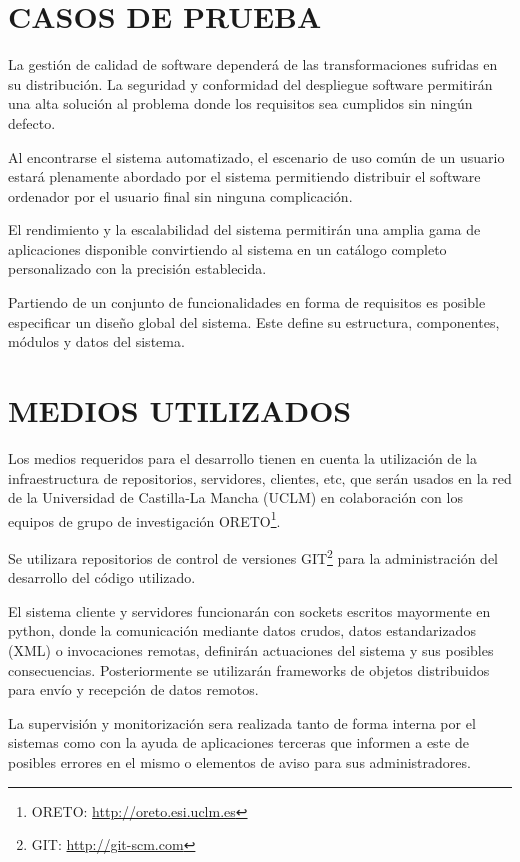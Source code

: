 \section{\uppercase{Casos de prueba}}

La gestión de calidad de software dependerá de las transformaciones sufridas
en su distribución.
La seguridad y conformidad del despliegue software permitirán una alta
solución al problema donde los requisitos sea cumplidos sin ningún defecto.

Al encontrarse el sistema automatizado, el escenario de uso común de un
usuario estará plenamente abordado por el sistema permitiendo distribuir el
software ordenador por el usuario final sin ninguna complicación.

El rendimiento y la escalabilidad del sistema permitirán una amplia gama de
aplicaciones disponible convirtiendo al sistema en un catálogo completo
personalizado con la precisión establecida.

Partiendo de un conjunto de funcionalidades en forma de requisitos es posible
especificar un diseño global del sistema. Este define su estructura,
componentes, módulos y datos del sistema.

\section{\uppercase{Medios utilizados}}

Los medios requeridos para el desarrollo tienen en cuenta la utilización de la
infraestructura de repositorios, servidores, clientes, etc, que serán usados
en la red de la Universidad de Castilla-La Mancha (UCLM) en colaboración
con los equipos de grupo de
investigación ORETO\footnote{ORETO:
\url{http://oreto.esi.uclm.es}\label{ftn:Oreto}}.

Se utilizara repositorios de control de versiones GIT\footnote{GIT:
\url{http://git-scm.com}\label{ftn:GIT}} para la administración del desarrollo
del código utilizado.

El sistema cliente y servidores funcionarán con sockets escritos mayormente en
python, donde la comunicación mediante datos crudos, datos estandarizados
(\acs{XML}\label{acro:XML}) o invocaciones remotas, definirán actuaciones del
sistema y sus posibles consecuencias. Posteriormente se utilizarán 
frameworks de objetos distribuidos para envío y recepción de datos remotos.

La supervisión y monitorización\cite{Mar11} sera realizada tanto de forma
interna por el sistemas como con la ayuda de aplicaciones terceras que
informen a este de posibles errores en el mismo o elementos de aviso para sus
administradores.


